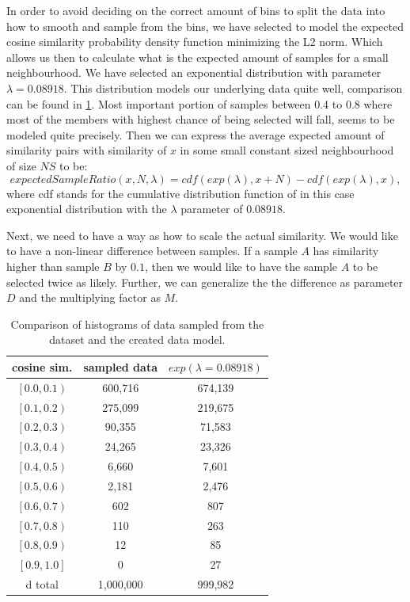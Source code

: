 In order to avoid deciding on the correct amount of bins to split the data into how to smooth and sample from the bins, we have selected to model the expected cosine similarity probability density function minimizing the L2 norm. Which allows us then to calculate what is the expected amount of samples for a small neighbourhood. We have selected an exponential distribution with parameter $\lambda=0.08918$. This distribution models our underlying data quite well, comparison can be found in \ref{table:5.3_modeled_comparison}. Most important portion of samples between 0.4 to 0.8 where most of the members with highest chance of being selected will fall, seems to be modeled quite precisely.
Then we can express the average expected amount of similarity pairs with similarity of $x$ in some small constant sized neighbourhood of size $NS$ to be:
\begin{equation}
    expectedSampleRatio(x, N, \lambda) = cdf(exp(\lambda), x + N) - cdf(exp(\lambda), x),
\end{equation}
where cdf stands for the cumulative distribution function of in this case exponential distribution with the $\lambda$ parameter of $0.08918$.

Next, we need to have a way as how to scale the actual similarity. We would like to have a non-linear difference between samples. If a sample $A$ has similarity higher than sample $B$ by $0.1$, then we would like to have the sample $A$ to be selected twice as likely. Further, we can generalize the the difference as parameter $D$ and the multiplying factor as $M$.

\begin{table}[!ht]
    \centering
    \begin{tabular}{ c | c | c}
       cosine sim. & sampled data & $exp(\lambda=0.08918)$ \\
        \hline
        $\left[ 0.0, 0.1\right)$ & 600,716 & 674,139 \\
        $\left[ 0.1, 0.2\right)$ & 275,099 & 219,675 \\
        $\left[ 0.2, 0.3\right)$ & 90,355 & 71,583 \\
        $\left[ 0.3, 0.4\right)$ & 24,265 & 23,326 \\
        $\left[ 0.4, 0.5\right)$ & 6,660 & 7,601 \\
        $\left[ 0.5, 0.6\right)$ & 2,181 & 2,476 \\
        $\left[ 0.6, 0.7\right)$ & 602 & 807 \\
        $\left[ 0.7, 0.8\right)$ & 110 & 263 \\
        $\left[ 0.8, 0.9\right)$ & 12 & 85 \\
        $\left[ 0.9, 1.0\right]$ & 0 & 27 \\d
        total & 1,000,000 & 999,982
            
    \end{tabular}
    \caption{Comparison of histograms of data sampled from the dataset and the created data model.}
    \label{table:5.3_modeled_comparison}
\end{table}


